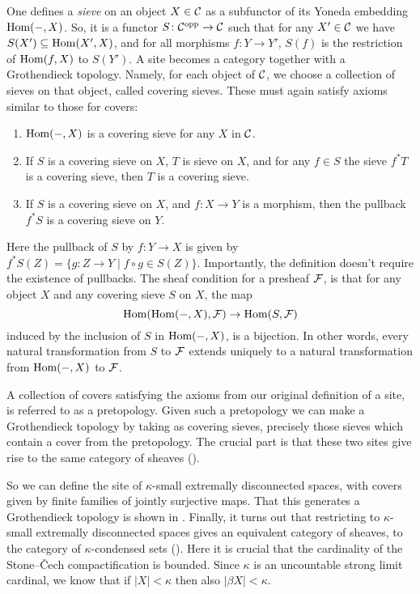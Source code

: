 \documentclass{article}
\DeclareMathOperator{\opp}{opp}
\begin{document}
One defines a \emph{sieve} on an object $X \in \mathcal{C}$ as a subfunctor
of its Yoneda embedding $\operatorname{Hom}(- ,X)$. So, it is a functor $S \colon \mcC^{\opp} \to \mcC$
such that for any $X' \in \mathcal{C}$ we have $S(X') \subseteq \operatorname{Hom}(X', X)$,
and for all morphisms $f\colon Y \to Y'$, $S(f)$ is the restriction
of $\operatorname{Hom}(f, X)$ to $S(Y')$. A site becomes a category together with
a Grothendieck topology. Namely, for each object of $\mathcal{C}$,
we choose a collection of sieves on that object, called covering sieves.
These must again satisfy axioms similar to those for covers:
\begin{enumerate}
    \item $\operatorname{Hom}(-, X)$ is a covering sieve for any $X$ in $\mathcal{C}$.
    \item If $S$ is a covering sieve on $X$, $T$ is sieve on $X$,
          and for any $f\in S$ the sieve $f^*T$ is a covering sieve,
          then $T$ is a covering sieve.
    \item If $S$ is a covering sieve on $X$, and $f\colon X \to Y$ is
          a morphism, then the pullback $f^*S$ is a covering sieve on $Y$.
\end{enumerate}
Here the pullback of $S$ by $f\colon Y \to X$ is given by
$f^*S(Z)= \{g\colon Z \to Y \mid f\circ g \in S(Z)\}$.
Importantly, the definition doesn't require the existence of pullbacks.
The sheaf condition for a presheaf $\mathcal{F}$, is that for any
object $X$ and any covering sieve $S$ on $X$, the map
\begin{equation*}
    \operatorname{Hom}(\operatorname{Hom}(-, X), \mathcal{F}) \to \operatorname{Hom}(S, \mathcal{F})
\end{equation*}
induced by the inclusion of $S$ in $\operatorname{Hom}(-, X)$, is a bijection.
In other words, every natural transformation from $S$ to $\mathcal{F}$
extends uniquely to a natural transformation from $\operatorname{Hom}(-, X)$
to $\mathcal{F}$.

A collection of covers satisfying the axioms from our original definition
of a site, is referred to as a pretopology. Given such a pretopology
we can make a Grothendieck topology by taking as covering sieves,
precisely those sieves which contain a cover from the pretopology.
The crucial part is that these two sites give rise to the same category
of sheaves (\cite[Corollary 1.1.28]{Dag2021FoundationsCM}).

So we can define the site of $\kappa$-small extremally
disconnected spaces, with covers given by finite families
of jointly surjective maps. That this generates a Grothendieck
topology is shown in \cite[Proposition 1.2.12]{Dag2021FoundationsCM}.
Finally, it turns out that restricting to $\kappa$-small extremally disconnected
spaces gives an equivalent category of sheaves, to the category
of $\kappa$-condensed sets (\cite[Theorem 1.2.16]{Dag2021FoundationsCM}).
Here it is crucial that the cardinality of the Stone--\v{C}ech compactification
is bounded. Since $\kappa$ is an uncountable strong limit cardinal,
we know that if $|X| < \kappa$ then also $|\beta X| < \kappa$.
\end{document}

